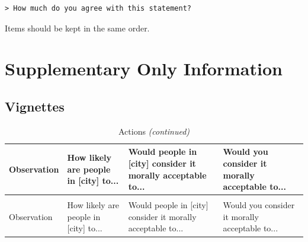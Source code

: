 \documentclass[
]{article}
\begin{document}
\begin{verbatim}
> How much do you agree with this statement?
\end{verbatim}

Items should be kept in the same order.

\section{Supplementary Only
Information}\label{supplementary-only-information}

\subsection{Vignettes}\label{vignettes-1}

\begin{longtable}[t]{>{\raggedright\arraybackslash}p{6.5cm}>{\raggedright\arraybackslash}p{2.5cm}>{\raggedright\arraybackslash}p{2.5cm}>{\raggedright\arraybackslash}p{2.5cm}}
\caption{\label{tab:print-scenarios2}Actions}\\
\toprule
Observation & How likely are people in [city] to... & Would people in [city] consider it morally acceptable to... & Would you consider it morally acceptable to...\\
\midrule
\endfirsthead
\caption[]{Actions \textit{(continued)}}\\
\toprule
Observation & How likely are people in [city] to... & Would people in [city] consider it morally acceptable to... & Would you consider it morally acceptable to...\\
\midrule
\endhead


\end{longtable}
\end{document}

